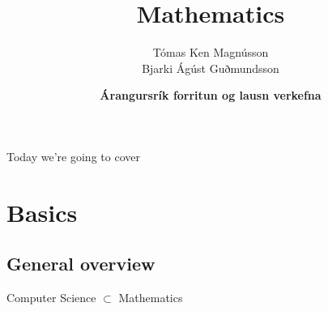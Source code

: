 \documentclass[10pt]{beamer}
\title{Mathematics}
\author{Tómas Ken Magnússon \\ Bjarki Ágúst Guðmundsson}
\institute{\href{http://ru.is/td}{School of Computer Science} \\[2pt] \href{http://ru.is}{Reykjavík University}}
\date{\textbf{Árangursrík forritun og lausn verkefna}}
\newcommand{\bi}{\begin{itemize}}
\newcommand{\ei}{\end{itemize}}
\begin{document}
\maketitle

\begin{frame}{Today we're going to cover}
    \vspace{22pt}
    \tableofcontents[hideallsubsections]
\end{frame}

\section{Basics}
\subsection{General overview}

\begin{frame}%
  \vspace{60pt}
  \begin{center}
  Computer Science $\subset$ Mathematics
  \end{center}
\end{frame}
\end{document}
